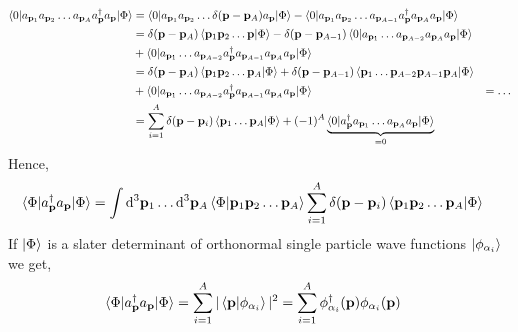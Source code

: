 \documentclass[10pt]{article}
\begin{document}
\begin{align}
	\braket{0 | a_{\mathbf{p}_{1}} a_{\mathbf{p}_{2}} \ldots a_{\mathbf{p}_{A}} a_{\mathbf{p}}^{\dagger} a_{\mathbf{p}} | \Phi} &=
	\braket{0 | a_{\mathbf{p}_{1}} a_{\mathbf{p}_{2}} \ldots \delta(\mathbf{p}-\mathbf{p}_{A}) a_{\mathbf{p}} | \Phi} - \braket{0 | a_{\mathbf{p}_{1}} a_{\mathbf{p}_{2}} \ldots a_{\mathbf{p}_{A-1}} a_{\mathbf{p}}^{\dagger} a_{\mathbf{p}_{A}} a_{\mathbf{p}} | \Phi} \\
	&= \delta(\mathbf{p}-\mathbf{p}_{A}) \braket{\mathbf{p}_{1} \mathbf{p}_{2} \ldots \mathbf{p} | \Phi } - \delta(\mathbf{p}-\mathbf{p}_{A-1}) \braket{0 | a_{\mathbf{p}_1} \ldots a_{\mathbf{p}_{A-2}} a_{\mathbf{p}_{A}} a_{\mathbf{p}} | \Phi} \\
	&+ \braket{0| a_{\mathbf{p}_1} \ldots a_{\mathbf{p}_{A-2}} a_{\mathbf{p}}^{\dagger} a_{\mathbf{p}_{A-1}} a_{\mathbf{p}_{A}} a_{\mathbf{p}} | \Phi} \\
 &= \delta(\mathbf{p}-\mathbf{p}_{A}) \braket{\mathbf{p}_{1} \mathbf{p}_{2} \ldots \mathbf{p}_{A} | \Phi } + \delta(\mathbf{p}-\mathbf{p}_{A-1}) \braket{\mathbf{p}_{1} \ldots \mathbf{p}_{A-2} \mathbf{p}_{A-1} \mathbf{p}_{A} | \Phi} \\
	&+ \braket{0| a_{\mathbf{p}_1} \ldots a_{\mathbf{p}_{A-2}} a_{\mathbf{p}}^{\dagger} a_{\mathbf{p}_{A-1}} a_{\mathbf{p}_{A}} a_{\mathbf{p}} | \Phi}
	&= \ldots \\
	&= \sum_{i=1}^{A} \delta(\mathbf{p} - \mathbf{p}_{i}) \braket{ \mathbf{p}_{1} \ldots \mathbf{p}_{A} | \Phi} + (-1)^{A} \underbrace{\braket{ 0 | a_{\mathbf{p}}^{\dagger} a_{\mathbf{p}_1} \ldots a_{\mathbf{p}_{A}} a_{\mathbf{p}} | \Phi}}_{=0}
\end{align}
Hence,
\begin{align}
	\braket{ \Phi | a_{\mathbf{p}}^{\dagger} a_{\mathbf{p}} | \Phi} &= \int \textrm{d}^{3} \mathbf{p}_{1} \ldots \textrm{d}^{3} \mathbf{p}_{A} \braket {\Phi | \mathbf{p}_1 \mathbf{p}_2 \ldots \mathbf{p}_{A}} \sum_{i=1}^{A} \delta(\mathbf{p} - \mathbf{p}_{i}) \braket{ \mathbf{p}_{1} \mathbf{p}_{2} \ldots \mathbf{p}_{A} | \Phi}
\end{align}
If $\ket{\Phi}$ is a slater determinant of orthonormal single particle wave functions $\ket{\phi_{\alpha_{i}}}$ we get,
\begin{align}
	\braket{ \Phi | a_{\mathbf{p}}^{\dagger} a_{\mathbf{p}} | \Phi} &= \sum_{i=1}^{A} | \braket{ \mathbf{p} | \phi_{\alpha_{i}} } |^{2} = \sum_{i=1}^{A} \phi_{\alpha_i}^{\dagger}(\mathbf{p}) \phi_{\alpha_i}(\mathbf{p})
\end{align}
\end{document}

